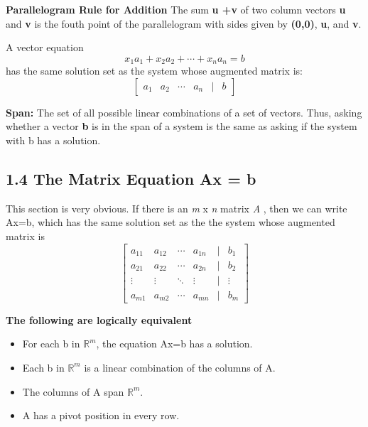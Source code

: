 \documentclass[12pt]{article}
\newcommand{\definition}[2]{
  \noindent\textbf{#1:} #2
}
\begin{document}
\begin{note}
    \textbf{Parallelogram Rule for Addition}
    The sum \textbf{u +v} of two column vectors {\bf u} and {\bf v} is the fouth point of the parallelogram with sides given by {\bf(0,0)}, {\bf u}, and {\bf v}.
\end{note}

\begin{keyconceptbox}
    A vector equation
    \[
    x_1a_1 + x_2a_2 + \cdots + x_na_n = b\]
    has the same solution set as the system whose augmented matrix is:
    \[
    \begin{bmatrix}
        a_1 & a_2 & \cdots & a_n & \vert & b
    \end{bmatrix}
    \]
\end{keyconceptbox}

\definition{Span}{The set of all possible linear combinations of a set of vectors. Thus, asking whether a vector \textbf{b} is in the span of a system is the same as asking if the system with b has a solution.}

\subsection*{1.4 The Matrix Equation Ax = b}
This section is very obvious. If there is an \textit{m} x \textit{n} matrix \textit{A} , then we can write Ax=b, which has the same solution set as the the system whose augmented matrix is 
$$
\begin{bmatrix}

    a_{11} & a_{12} & \cdots & a_{1n} & \vert & b_1 \\
    a_{21} & a_{22} & \cdots & a_{2n} & \vert & b_2 \\
    \vdots & \vdots & \ddots & \vdots & \vert & \vdots \\
    a_{m1} & a_{m2} & \cdots & a_{mn} & \vert & b_m
\end{bmatrix}$$

\begin{definitionbox}

    \textbf{The following are logically equivalent}
    \begin{itemize}
        \item For each b in $\mathbb{R}^m$, the equation Ax=b has a solution.
        \item Each b in $\mathbb{R}^m$ is a linear combination of the columns of A.
        \item The columns of A span $\mathbb{R}^m$.
        \item A has a pivot position in every row.
    \end{itemize}
\end{definitionbox}
\end{document}
